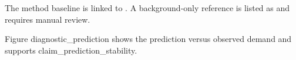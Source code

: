 \begin{abstract}
Problem: estimate supplier demand for a bounded planning scenario.
Method: use an interpretable regression baseline and compare it with two simple alternatives.
Result: the supplier demand forecast remains within 88 to 96 units and RMSE is 1.05.
Conclusion: demand remains within the observed planning range for the stable supplier group.
\end{abstract}

The method baseline is linked to \cite{method2024}. A background-only reference is listed as \cite{background2023} and requires manual review.

Figure diagnostic_prediction shows the prediction versus observed demand and supports claim_prediction_stability.
